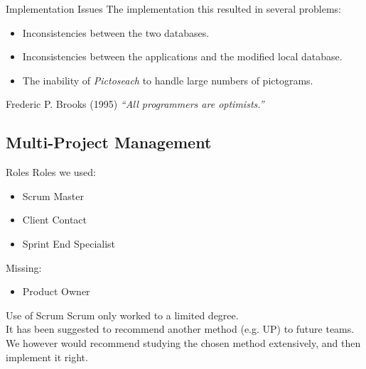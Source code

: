 \begin{frame}{Implementation Issues}
	The implementation this resulted in several problems:
	\begin{itemize}
		\item<1> Inconsistencies between the two databases.
		\item<2> Inconsistencies between the applications and the modified local database.
		\item<3> The inability of \textit{Pictoseach} to handle large numbers of pictograms.
	\end{itemize}
\pause
	\begin{block}{Frederic P. Brooks (1995)}
    	\textit{``All programmers are optimists.''}
   	\end{block}
\end{frame}


\subsection{Multi-Project Management}

\begin{frame}{Roles}
	Roles we used:
	\begin{itemize}
		\item Scrum Master
		\item Client Contact
		\item Sprint End Specialist
	\end{itemize}
	Missing:
	\begin{itemize}
		\item Product Owner
	\end{itemize}
\end{frame}

\begin{frame}{Use of Scrum}
	Scrum only worked to a limited degree.\\
	\vspace{\baselineskip}
	It has been suggested to recommend another method (e.g. UP) to future teams.\\
	\vspace{\baselineskip}
	We however would recommend studying the chosen method extensively, and then implement it right.
\end{frame}